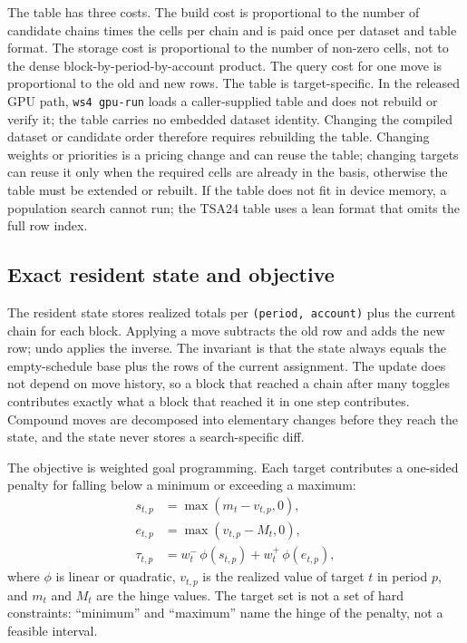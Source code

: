 \documentclass[a4paper,fleqn]{cas-sc}
\begin{document}
The table has three costs. The build cost is proportional to the number of candidate chains times the
cells per chain and is paid once per dataset and table format. The storage cost is proportional to the
number of non-zero cells, not to the dense block-by-period-by-account product. The query cost for one
move is proportional to the old and new rows. The table is target-specific. In the released GPU path,
\texttt{ws4 gpu-run} loads a caller-supplied table and does not rebuild or verify it; the table
carries no embedded dataset identity. Changing the compiled dataset or candidate order therefore
requires rebuilding the table. Changing weights or priorities is a pricing change and can reuse the
table; changing targets can reuse it only when the required cells are already in the basis, otherwise
the table must be extended or rebuilt. If the table does not fit in device memory, a population search cannot run; the TSA24
table uses a lean format that omits the full row index.

\subsection{Exact resident state and objective}

The resident state stores realized totals per \texttt{(period, account)} plus the current chain for each
block. Applying a move subtracts the old row and adds the new row; undo applies the inverse. The
invariant is that the state always equals the empty-schedule base plus the rows of the current
assignment. The update does not depend on move history, so a block that reached a chain after many
toggles contributes exactly what a block that reached it in one step contributes. Compound moves are
decomposed into elementary changes before they reach the state, and the state never stores a
search-specific diff.

The objective is weighted goal programming. Each target contributes a one-sided penalty for falling
below a minimum or exceeding a maximum:
\begin{align}
s_{t,p} &= \max(m_t - v_{t,p}, 0),\\
e_{t,p} &= \max(v_{t,p} - M_t, 0),\\
\tau_{t,p} &= w^-_t\,\phi(s_{t,p}) + w^+_t\,\phi(e_{t,p}),
\end{align}
where $\phi$ is linear or quadratic, $v_{t,p}$ is the realized value of target $t$ in period $p$, and
$m_t$ and $M_t$ are the hinge values. The target set is not a set of hard constraints: ``minimum'' and
``maximum'' name the hinge of the penalty, not a feasible interval.
\end{document}
